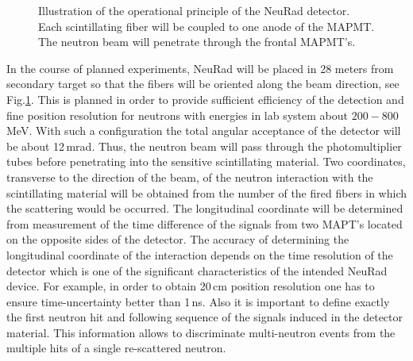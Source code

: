 \documentclass{webofc}
\begin{document}
\begin{figure}[h]
	\caption{Illustration of the operational principle of the NeuRad detector. Each scintillating fiber will be coupled to one anode of the MAPMT. The neutron beam will penetrate through the frontal MAPMT's.}
	\label{ris:neuradPrinciple}
\end{figure}

In the course of planned experiments, NeuRad will be placed in 28 meters from secondary target so that the fibers will be oriented along the beam direction, see Fig.\ref{ris:neuradPrinciple}.
This is planned in order to provide sufficient efficiency of the detection and fine position resolution for neutrons with energies in lab system about $200-800$\,MeV.
With such a configuration the total angular acceptance of the detector will be about 12\,mrad.
Thus, the neutron beam will pass through the photomultiplier tubes before penetrating into the sensitive scintillating material.
Two coordinates, transverse to the direction of the beam, of the neutron interaction with the scintillating material will be obtained from the number of the fired fibers in which the scattering would be occurred.
The longitudinal coordinate will be determined from measurement of the time difference of the signals from two MAPT's located on the opposite sides of the detector.
The accuracy of determining the longitudinal coordinate of the interaction depends on the time resolution of the detector which is one of the significant characteristics of the intended NeuRad device.
For example, in order to obtain 20\,cm position resolution one has to ensure time-uncertainty better than 1\,ns.
Also it is important to define exactly the first neutron hit and following sequence of the signals induced in the detector material. This information allows to discriminate multi-neutron events from the multiple hits of a single re-scattered neutron.

\end{document}

